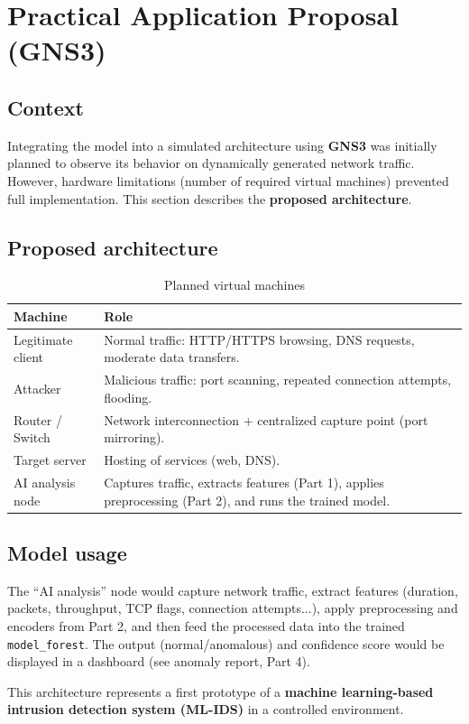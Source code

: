 \chapter{Practical Application Proposal (GNS3)}

\section{Context}

Integrating the model into a simulated architecture using \textbf{GNS3} was initially planned to observe its behavior on dynamically generated network traffic. However, hardware limitations (number of required virtual machines) prevented full implementation. This section describes the \textbf{proposed architecture}.

\section{Proposed architecture}

\begin{table}[H]
\centering
\caption{Planned virtual machines}
\label{tab:gns3}
\small
\begin{tabular}{p{3.8cm}p{9.2cm}}
\toprule
\textbf{Machine} & \textbf{Role} \\
\midrule
Legitimate client & Normal traffic: HTTP/HTTPS browsing, DNS requests, moderate data transfers. \\
Attacker & Malicious traffic: port scanning, repeated connection attempts, flooding. \\
Router / Switch & Network interconnection + centralized capture point (port mirroring). \\
Target server & Hosting of services (web, DNS). \\
AI analysis node & Captures traffic, extracts features (Part 1), applies preprocessing (Part 2), and runs the trained model. \\
\bottomrule
\end{tabular}
\end{table}


\section{Model usage}

The “AI analysis” node would capture network traffic, extract features (duration, packets, throughput, TCP flags, connection attempts...), apply preprocessing and encoders from Part 2, and then feed the processed data into the trained \texttt{model\_forest}. The output (normal/anomalous) and confidence score would be displayed in a dashboard (see anomaly report, Part 4).

This architecture represents a first prototype of a \textbf{machine learning-based intrusion detection system (ML-IDS)} in a controlled environment.
